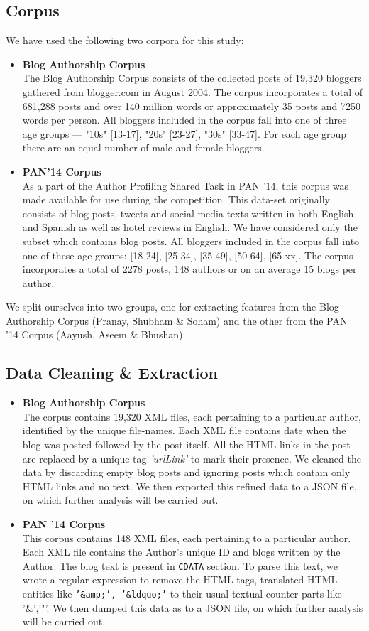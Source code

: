 \documentclass{sig-alternate}
\begin{document}
\subsection{Corpus}
We have used the following two corpora for this study:
\begin{itemize}
\item \textbf{Blog Authorship Corpus \cite{koppel1}}\\
The Blog Authorship Corpus consists of the collected posts of 19,320 bloggers gathered from blogger.com in August 2004. The corpus incorporates a total of 681,288 posts and over 140 million words or approximately 35 posts and 7250 words per person. All bloggers included in the corpus fall into one of three age groups --- "10s" [13-17], "20s" [23-27], "30s" [33-47].
For each age group there are an equal number of male and female bloggers.   
\item \textbf{PAN'14 Corpus}\\
As a part of the Author Profiling Shared Task in PAN '14, this corpus was made available for use during the competition. This data-set originally consists of blog posts, tweets and social media texts written in both English and Spanish as well as hotel reviews in English. We have considered only the subset which contains blog posts. All bloggers included in the corpus fall into one of these age groups: [18-24], [25-34], [35-49], [50-64], [65-xx].
The corpus incorporates a total of 2278 posts, 148 authors or on an average 15 blogs per author. 
\end{itemize}
We split ourselves into two groups, one for extracting features from the Blog Authorship Corpus (Pranay, Shubham \& Soham) and the other from the PAN '14 Corpus (Aayush, Aseem \& Bhushan).  
\subsection{Data Cleaning \& Extraction}
\begin{itemize}
\item \textbf{Blog Authorship Corpus}\\
The corpus contains 19,320 XML files, each pertaining to a particular author, identified by the unique file-names. Each XML file contains date when the blog was posted followed by the post itself. All the HTML links in the post are replaced by a unique tag \textit{'urlLink'} to mark their presence. We cleaned the data by discarding empty blog posts and ignoring posts which contain only HTML links and no text. We then exported this refined data to a JSON file, on which further analysis will be carried out.
\item \textbf{PAN '14 Corpus}\\
This corpus contains 148 XML files, each pertaining to a particular author. Each XML file contains the Author's unique ID and blogs written by the Author. The blog text is present in \texttt{CDATA} section. To parse this text, we wrote a regular expression to remove the HTML tags, translated HTML entities like \texttt{'\&amp;', '\&ldquo;'} to their usual textual counter-parts like '\&','"'. We then dumped this data as to a JSON file, on which further analysis will be carried out.
\end{itemize}
\end{document}
